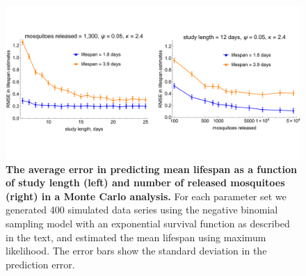 \documentclass[12pt]{article}
\begin{document}
\begin{figure}[ht]
	\centerline{\includegraphics[width=1.25\textwidth]{./Figure_files/mrr_mcPowerAnalysis.pdf}}
	\caption{\textbf{The average error in predicting mean lifespan as a function of study length (left) and number of released mosquitoes (right) in a Monte Carlo analysis.} For each parameter set we generated 400 simulated data series using the negative binomial sampling model with an exponential survival function as described in the text, and estimated the mean lifespan using maximum likelihood. The error bars show the standard deviation in the prediction error.}
	\label{fig:mrr_mcPowerAnalysis}
\end{figure}
\end{document}
